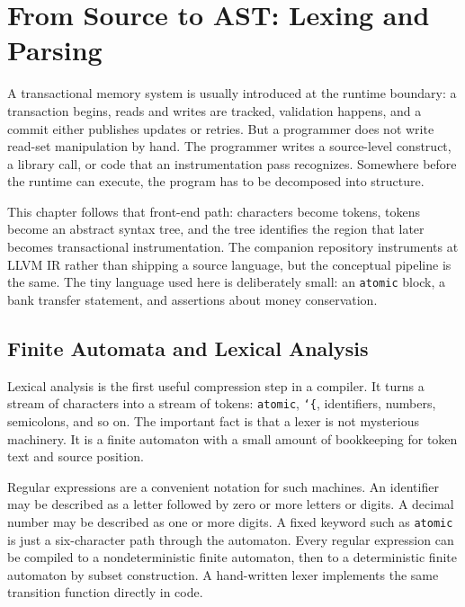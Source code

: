 \chapter{From Source to AST: Lexing and Parsing}

A transactional memory system is usually introduced at the runtime boundary: a transaction begins, reads and writes are tracked, validation happens, and a commit either publishes updates or retries. But a programmer does not write read-set manipulation by hand. The programmer writes a source-level construct, a library call, or code that an instrumentation pass recognizes. Somewhere before the runtime can execute, the program has to be decomposed into structure.

This chapter follows that front-end path: characters become tokens, tokens become an abstract syntax tree, and the tree identifies the region that later becomes transactional instrumentation. The companion repository instruments at LLVM IR rather than shipping a source language, but the conceptual pipeline is the same. The tiny language used here is deliberately small: an \texttt{atomic} block, a bank transfer statement, and assertions about money conservation.

\section{Finite Automata and Lexical Analysis}

Lexical analysis is the first useful compression step in a compiler. It turns a stream of characters into a stream of tokens: \texttt{atomic}, \texttt{\char`\{}, identifiers, numbers, semicolons, and so on. The important fact is that a lexer is not mysterious machinery. It is a finite automaton with a small amount of bookkeeping for token text and source position.

Regular expressions are a convenient notation for such machines. An identifier may be described as a letter followed by zero or more letters or digits. A decimal number may be described as one or more digits. A fixed keyword such as \texttt{atomic} is just a six-character path through the automaton. Every regular expression can be compiled to a nondeterministic finite automaton, then to a deterministic finite automaton by subset construction. A hand-written lexer implements the same transition function directly in code.

